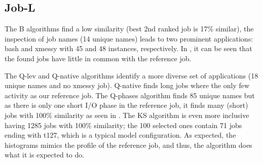 \documentclass{jhps}
\begin{document}
%
%

\subsection{Job-L}

The B algorithms find a low similarity (best 2nd ranked job is 17\% similar), the inspection of job names (14 unique names) leads to two prominent applications: bash and xmessy with 45 and 48 instances, respectively.
In , it can be seen that the found jobs have little in common with the reference job.

The Q-lev and Q-native algorithms identify a more diverse set of applications (18 unique names and no xmessy job).
Q-native  finds long jobs where the only few activity as our reference job.
The Q-phases algorithm finds 85 unique names but as there is only one short I/O phase in the reference job, it finds many (short) jobs with 100\% similarity as seen in .
The KS algorithm is even more inclusive having 1285 jobs with 100\% similarity; the 100 selected ones contain 71 jobs ending with t127, which is a typical model configuration.
As expected, the histograms mimics the profile of the reference job, and thus, the algorithm does what it is expected to do.
\end{document}
